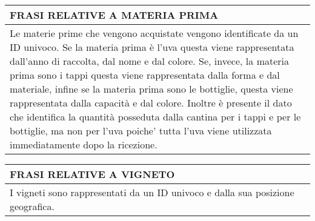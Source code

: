 \begin{center}
	\vspace{0.5cm}

	\begin{tabular}{P{16cm}}
		\toprule
		 \textbf {\large {FRASI RELATIVE A MATERIA PRIMA}}                                                                                                                                                                                                                                                                                                                                                                                                                                                                                                                \\
		\midrule
		Le materie prime che vengono acquistate vengono identificate da un ID univoco. Se la materia prima è l'uva questa viene rappresentata dall'anno di raccolta, dal nome e dal colore. Se, invece, la materia prima sono i tappi questa viene rappresentata dalla forma e dal materiale, infine se la materia prima sono le bottiglie, questa viene rappresentata dalla capacità e dal colore. Inoltre è presente il dato che identifica la quantità posseduta dalla cantina per i tappi e per le bottiglie, ma non per l'uva poiche' tutta l'uva viene utilizzata immediatamente dopo la ricezione. \\
		\bottomrule
	\end{tabular}

	\vspace{0.5cm}

	\begin{tabular}{P{16cm}}
		\toprule
		 \textbf {\large {FRASI RELATIVE A VIGNETO}}     \\
		\midrule
		I vigneti sono rappresentati da un ID univoco e dalla sua posizione geografica. \\
		\bottomrule
	\end{tabular}

	\vspace{0.5cm}


\end{center}
